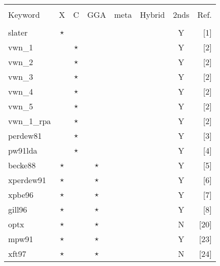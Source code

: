 \twocolumn
\begin{table}[htp]

\begin{tabular}{|l|cccccc|r|}
\hline
           &          &             &        &      &        &      &    \\
Keyword    & X        & C           & GGA    & meta & Hybrid & 2nds & Ref.\\
           &          &             &        &      &        &      &    \\
\hline
 slater    & $\star$  &             &        &      &        &  Y   &[1] \\
\hline                                                  
vwn\_1     &          &   $\star$   &        &      &        &  Y   &[2] \\
vwn\_2     &          &   $\star$   &        &      &        &  Y   &[2] \\
vwn\_3     &          &   $\star$   &        &      &        &  Y   &[2] \\
vwn\_4     &          &   $\star$   &        &      &        &  Y   &[2] \\
vwn\_5     &          &   $\star$   &        &      &        &  Y   &[2] \\
vwn\_1\_rpa&          &   $\star$   &        &      &        &  Y   &[2] \\
perdew81   &          &   $\star$   &        &      &        &  Y   &[3] \\
pw91lda    &          &   $\star$   &        &      &        &  Y   &[4] \\
\hline                                                  
becke88    & $\star$  &             &  $\star$  &   &        &  Y   &[5]\\
xperdew91  & $\star$  &             &  $\star$  &   &        &  Y   &[6]\\
xpbe96     & $\star$  &             &  $\star$  &   &        &  Y   &[7]\\
gill96     & $\star$  &             &  $\star$  &   &        &  Y   &[8]\\
optx       & $\star$  &             &  $\star$  &   &        &  N   &[20]\\
mpw91      & $\star$  &             &  $\star$  &   &        &  Y   &[23]\\
xft97      & $\star$  &             &  $\star$  &   &        &  N   &[24]\\
\hline                                                  

\end{tabular}
\end{table}
